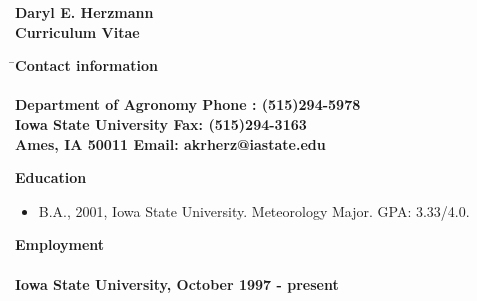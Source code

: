 \renewcommand{\oddsidemargin}{0pt}
\renewcommand{\evensidemargin}{0pt}
\renewcommand{\topmargin}{0pt}
\renewcommand{\headheight}{0pt}
\renewcommand{\headsep}{0pt}
\renewcommand{\textwidth}{468pt}
\renewcommand{\textheight}{230mm}
\hoffset=-60pt
\voffset=-36pt
%
\settowidth{\parindent}{}
\setlength{\parskip}{2mm}
%
\newcommand{\dvd}{\rule{30mm}{0.2mm}}
\newcommand{\beq}{\begin{equation}}
\newcommand{\beqn}{\begin{eqnarray}}
\newcommand{\eeq}{\end{equation}}
\newcommand{\eeqn}{\end{eqnarray}}
\newcommand{\lsf}{\large \sf}
%
\newcommand{\qbar}{\mbox{$\overline{q}$}}
\pagestyle{empty}
%

%
\vspace*{0.25in}
\begin{center}
\LARGE \bf Daryl E. Herzmann\\
\Large \bf Curriculum Vitae\\
\end{center}
\begin{tabbing}
\= \Large \bf Contact information \hspace*{2.5in} \= \\
\> \> \\
\> \lsf Department of Agronomy \> \lsf Phone : (515)294-5978\\
\> \lsf Iowa State University \> \lsf Fax: (515)294-3163\\
\> \lsf Ames, IA 50011 \> \lsf Email: akrherz@iastate.edu \\
\end{tabbing}
\Large \bf Education
\normalsize \sf
\begin{itemize}
\item B.A., 2001, Iowa State University.  Meteorology Major. GPA: 3.33/4.0.
\end{itemize}
\Large \bf Employment\\ \\
\normalsize \bf Iowa State University, October 1997 - present
\normalsize \sf
